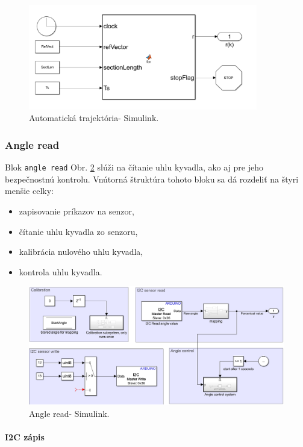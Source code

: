 \begin{figure}[!tbh]
	\centering
	\includegraphics[width=100mm]{obr/AutoSimul.png}
	\caption{Automatická trajektória- Simulink.}\label{OBRAZOK 2.6.66}
\end{figure}

\subsubsection{Angle read}

Blok \verb|angle read| Obr. \ref{OBRAZOK 2.6.6} slúži na čítanie uhlu kyvadla, ako aj pre jeho bezpečnostnú kontrolu. Vnútorná štruktúra tohoto bloku sa dá rozdeliť na štyri menšie celky: 
\begin{itemize}
	\item zapisovanie príkazov na senzor,  
	\item čítanie uhlu kyvadla zo senzoru, 
	\item kalibrácia nulového uhlu kyvadla,
	\item kontrola uhlu kyvadla. 
\end{itemize}

\begin{figure}[!tbh]
	\centering
	\includegraphics[width=\textwidth]{obr/AngleRead.png}
	\caption{Angle read- Simulink.}\label{OBRAZOK 2.6.6}
\end{figure}


\paragraph{I2C zápis}

